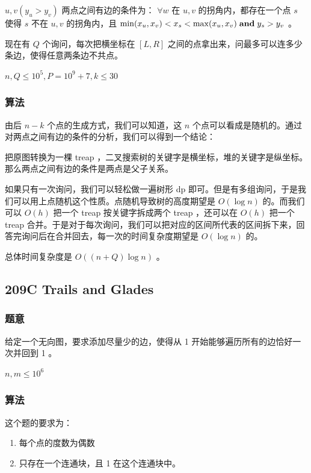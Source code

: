 \documentclass[11pt]{article}
\begin{document}
 $u, v (y_u > y_v)$ 两点之间有边的条件为： $\forall w$ 在 $u, v$ 的拐角内，都存在一个点 $s$ 使得 $s$ 不在 $u, v$ 的拐角内，且 $\min (x_u, x_v) < x_s < \max(x_u, x_v) \hspace{0.1cm} \textbf{and} \hspace{0.1cm} y_s > y_v$ 。

现在有 $Q$ 个询问，每次把横坐标在 $[L, R]$ 之间的点拿出来，问最多可以连多少条边，使得任意两条边不共点。

$n,Q \leq 10^5, P = 10^9 + 7, k \leq 30$
\subsubsection{算法}
\label{sec-12-2-2}

由后 $n - k$ 个点的生成方式，我们可以知道，这 $n$ 个点可以看成是随机的。通过对两点之间有边的条件的分析，我们可以得到一个结论：

\begin{theorem}
把原图转换为一棵 treap ，二叉搜索树的关键字是横坐标，堆的关键字是纵坐标。那么两点之间有边的条件是两点是父子关系。
\end{theorem}

如果只有一次询问，我们可以轻松做一遍树形 dp 即可。但是有多组询问，于是我们可以用上点随机这个性质。点随机导致树的高度期望是 $O(\log n)$ 的。而我们可以 $O(h)$ 把一个 treap 按关键字拆成两个 treap ，还可以在 $O(h)$ 把一个 treap 合并。于是对于每次询问，我们可以把对应的区间所代表的区间拆下来，回答完询问后在合并回去，每一次的时间复杂度期望是 $O(\log n)$ 的。

总体时间复杂度是 $O((n + Q) \log n)$ 。
\subsection{209C  Trails and Glades}
\label{sec-12-3}
\subsubsection{题意}
\label{sec-12-3-1}

    给定一个无向图，要求添加尽量少的边，使得从 1 开始能够遍历所有的边恰好一次并回到 1 。

    $n, m \leq 10^6$
\subsubsection{算法}
\label{sec-12-3-2}

    这个题的要求为：
\begin{enumerate}
\item 每个点的度数为偶数
\item 只存在一个连通块，且 1 在这个连通块中。
\end{enumerate}
\end{document}
